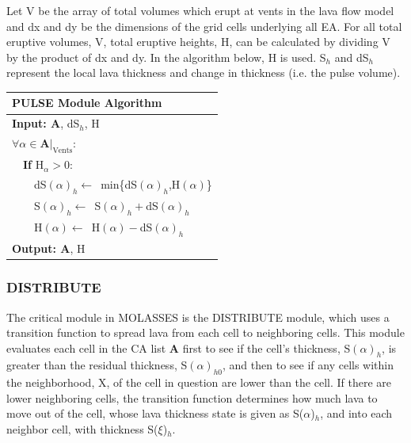 \documentclass[12pt,letter]{article}
\begin{document}
			Let V be the array of total volumes which erupt at vents in the lava flow model and dx and dy be the dimensions of the grid cells underlying all EA. For all total eruptive volumes, V, total eruptive heights, H, can be calculated by dividing V by the product of dx and dy. In the algorithm below, H is used. S$_h$ and dS$_h$ represent the local lava thickness and change in thickness (i.e. the pulse volume).
			\begin{center}
				\begin{tabular}{l}
					\toprule
					\textbf{PULSE Module Algorithm}\\
					\midrule
					\textbf{Input: A}, dS$_h$, H\\
					$\forall \alpha \in \mathbf{A}|_{\mathrm{Vents}}$:\\
					~~\textbf{If} H$_\alpha>0$:\\
					~~~~dS$(\alpha)_h\leftarrow$~min\{dS$(\alpha)_h$,H$(\alpha)$\}\\
					~~~~S$(\alpha)_h\leftarrow$~S$(\alpha)_h+$dS$(\alpha)_h$\\
					~~~~H$(\alpha)\leftarrow$~H$(\alpha)-$dS$(\alpha)_h$\\
					\textbf{Output: A}, H\\
					\bottomrule
				\end{tabular}
			\end{center}
		
		\subsubsection{DISTRIBUTE}\label{mod:DISTRIBUTE}
			
			The critical module in MOLASSES is the DISTRIBUTE module, which uses a transition function to spread lava from each cell to neighboring cells. This module evaluates each cell in the CA list \textbf{A} first to see if the cell's thickness, S$(\alpha)_h$, is greater than the residual thickness, S$(\alpha)_{h0}$, and then to see if any cells within the neighborhood, X, of the cell in question are lower than the cell. If there are lower neighboring cells, the transition function determines how much lava to move out of the cell, whose lava thickness state is given as S($\alpha$)$_h$, and into each neighbor cell, with thickness S($\xi$)$_h$.
			
\end{document}

